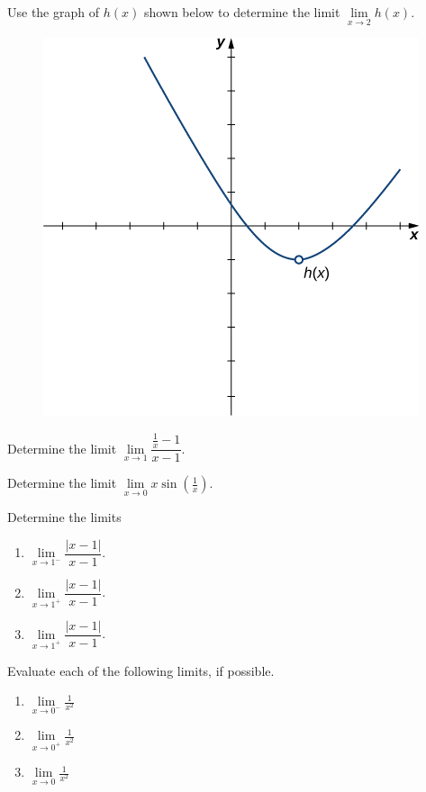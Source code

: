 \begin{exercise}
  Use the graph of \(h(x)\) shown below to determine
  the limit \(\lim\limits_{x \to 2}h(x)\).
  
  \begin{figure}[h!]
  \centering
  \includegraphics[scale=0.8]{img/imageedit_13_2727890618.png}
  \end{figure}
\end{exercise}
\vspace*{\baselineskip}


\begin{exercise}
  Determine the limit
  \(\lim\limits_{x\to 1}\dfrac{\frac1x-1}{x-1}\).
\end{exercise}
\vspace*{6\baselineskip}

\begin{exercise}
  Determine the limit
  \(\lim\limits_{x\to 0}x\sin\left(\frac1x\right)\).
\end{exercise}
\vspace*{6\baselineskip}

\begin{exercise}
  Determine the limits
  
  \begin{enumerate}
  \item
    \(\lim\limits_{x\to 1^-}\dfrac{|x-1|}{x-1}\).
  \item
    \(\lim\limits_{x\to 1^+}\dfrac{|x-1|}{x-1}\).
  \item
    \(\lim\limits_{x\to 1^+}\dfrac{|x-1|}{x-1}\).
  \end{enumerate}
\end{exercise}

\begin{exercise}
  Evaluate each of the following limits, if possible.
  
  \begin{enumerate}
  \item
    \(\lim\limits_{x \to 0^-}\frac{1}{x^2}\)
  \item
    \(\lim\limits_{x \to 0^+}\frac{1}{x^2}\)
  \item
    \(\lim\limits_{x \to 0}\frac{1}{x^2}\)
  \end{enumerate}
\end{exercise}
